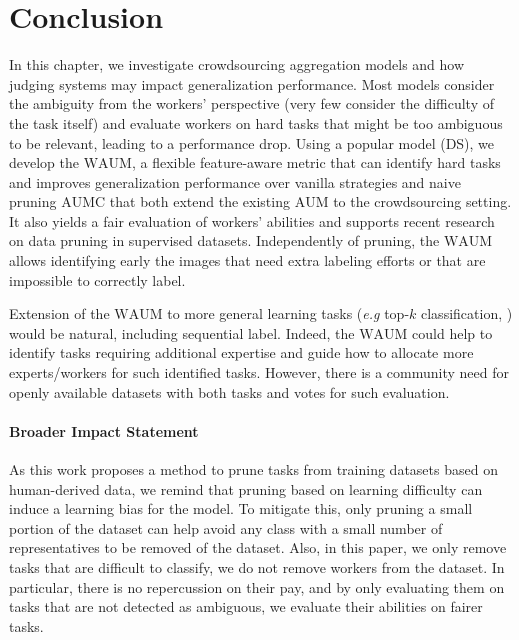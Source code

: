 \section{Conclusion}
In this chapter, we investigate crowdsourcing aggregation models and how judging systems may impact generalization performance.
Most models consider the ambiguity from the workers' perspective (very few consider the difficulty of the task itself) and evaluate workers on hard tasks that might be too ambiguous to be relevant, leading to a performance drop.
Using a popular model (DS), we develop the $\mathrm{WAUM}$, a flexible feature-aware metric that can identify hard tasks and improves generalization performance over vanilla strategies and naive pruning $\mathrm{AUMC}$ that both extend the existing $\mathrm{AUM}$ to the crowdsourcing setting.
It also yields a fair evaluation of workers' abilities and supports recent research on data pruning in supervised datasets.
Independently of pruning, the $\mathrm{WAUM}$ allows identifying early the images that need extra labeling efforts or that are impossible to correctly label.

Extension of the $\mathrm{WAUM}$ to more general learning tasks (\emph{e.g} top-$k$ classification, ) would be natural, including sequential label.
Indeed, the $\mathrm{WAUM}$ could help to identify tasks requiring additional expertise and guide how to allocate more experts/workers for such identified tasks. However, there is a community need for openly available datasets with both tasks and votes for such evaluation.

\paragraph*{Broader Impact Statement}
As this work proposes a method to prune tasks from training datasets based on human-derived data, we remind that pruning based on learning difficulty can induce a learning bias for the model.
To mitigate this, only pruning a small portion of the dataset can help avoid any class with a small number of representatives to be removed of the dataset.
Also, in this paper, we only remove tasks that are difficult to classify, we do not remove workers from the dataset.
In particular, there is no repercussion on their pay, and by only evaluating them on tasks that are not detected as ambiguous, we evaluate their abilities on fairer tasks.

